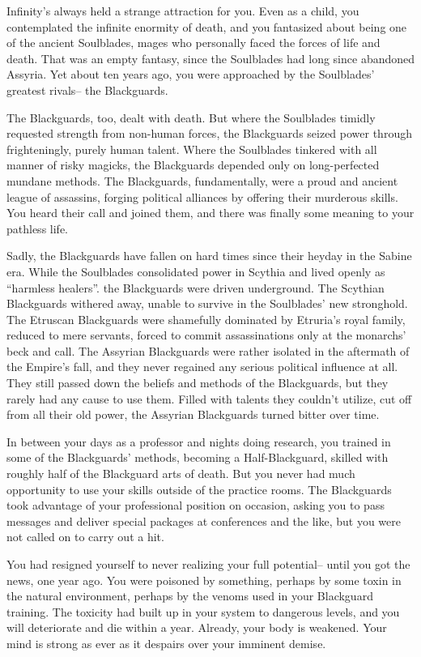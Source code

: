 \documentclass[char]{Kos}
\begin{document}
Infinity's always held a strange attraction for you. Even as a child, you contemplated the infinite enormity of death, and you fantasized about being one of the ancient Soulblades, mages who personally faced the forces of life and death. That was an empty fantasy, since the Soulblades had long since abandoned Assyria. Yet about ten years ago, you were approached by the Soulblades' greatest rivals-- the Blackguards.

The Blackguards, too, dealt with death. But where the Soulblades timidly requested strength from non-human forces, the Blackguards seized power through frighteningly, purely human talent.  Where the Soulblades tinkered with all manner of risky magicks, the Blackguards depended only on long-perfected mundane methods. The Blackguards, fundamentally, were a proud and ancient league of assassins, forging political alliances by offering their murderous skills. You heard their call and joined them, and there was finally some meaning to your pathless life.

Sadly, the Blackguards have fallen on hard times since their heyday in the Sabine era. While the Soulblades consolidated power in Scythia and lived openly as ``harmless healers''. the Blackguards were driven underground. The Scythian Blackguards withered away, unable to survive in the Soulblades' new stronghold. The Etruscan Blackguards were shamefully dominated by Etruria's royal family, reduced to mere servants, forced to commit assassinations only at the monarchs' beck and call. The Assyrian Blackguards were rather isolated in the aftermath of the Empire's fall, and they never regained any serious political influence at all. They still passed down the beliefs and methods of the Blackguards, but they rarely had any cause to use them. Filled with talents they couldn't utilize, cut off from all their old power, the Assyrian Blackguards turned bitter over time.

In between your days as a professor and nights doing research, you trained in some of the Blackguards' methods, becoming a Half-Blackguard, skilled with roughly half of the Blackguard arts of death. But you never had much opportunity to use your skills outside of the practice rooms. The Blackguards took advantage of your professional position on occasion, asking you to pass messages and deliver special packages at conferences and the like, but you were not called on to carry out a hit.

You had resigned yourself to never realizing your full potential-- until you got the news, one year ago. You were poisoned by something, perhaps by some toxin in the natural environment, perhaps by the venoms used in your Blackguard training. The toxicity had built up in your system to dangerous levels, and you will deteriorate and die within a year. Already, your body is weakened. Your mind is strong as ever as it despairs over your imminent demise.
\end{document}
